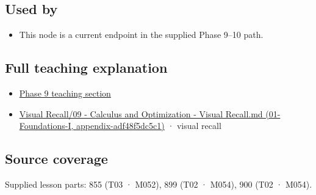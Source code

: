 \subsection{Used by}\label{used-by}

\begin{itemize}
\tightlist
\item
  This node is a current endpoint in the supplied Phase 9--10 path.
\end{itemize}

\subsection{Full teaching explanation}\label{full-teaching-explanation}

\begin{itemize}
\tightlist
\item
  \href{Continuous\%20Notes/Computing\%20Foundations\%20-\%20From\%20Bits\%20to\%20C++\%20and\%20Systems\%20APIs\#Numerical\%20differentiation\%20and\%20automatic\%20differentiation}{Phase 9 teaching section}
\item
  \href{}{Visual Recall/09 - Calculus and Optimization - Visual Recall.md (01-Foundations-I, appendix-adf48f5dc5c1)} · visual recall
\end{itemize}

\subsection{Source coverage}\label{source-coverage}

Supplied lesson parts: 855 (T03 · M052), 899 (T02 · M054), 900 (T02 · M054).
